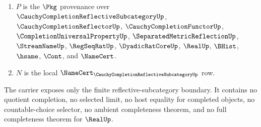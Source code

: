 \begin{definition}
\begin{enumerate}
\item $P$ is the $\Pkg$ provenance over $\CauchyCompletionReflectiveSubcategoryUp$, $\CauchyCompletionReflectorUp$, $\CauchyCompletionFunctorUp$, $\CompletionUniversalPropertyUp$, $\SeparatedMetricReflectionUp$, $\StreamNameUp$, $\RegSeqRatUp$, $\DyadicRatCoreUp$, $\RealUp$, $\BHist$, $\hsame$, $\Cont$, and $\NameCert$.
\item $N$ is the local $\NameCert_{\CauchyCompletionReflectiveSubcategoryUp}$ row.
\end{enumerate}
The carrier exposes only the finite reflective-subcategory boundary. It contains no quotient completion, no selected limit, no host equality for completed objects, no countable-choice selector, no ambient completeness theorem, and no full completeness theorem for $\RealUp$.
\end{definition}

